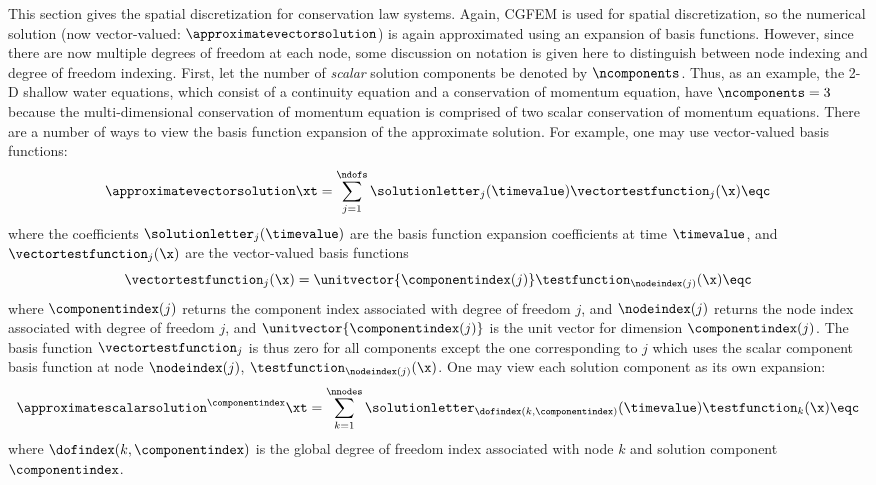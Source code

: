 This section gives the spatial discretization for conservation law systems.
Again, CGFEM is used for
spatial discretization, so the numerical solution (now vector-valued:
$\approximatevectorsolution$) is again approximated using an expansion of basis
functions. However, since there are now multiple degrees of freedom at each
node, some discussion on notation is given here to distinguish between node
indexing and degree of freedom indexing.  First, let the number of
\emph{scalar} solution components be denoted by $\ncomponents$.  Thus, as an
example, the 2-D shallow water equations, which consist of a continuity
equation and a conservation of momentum equation, have $\ncomponents=3$ because
the multi-dimensional conservation of momentum equation is comprised of two
scalar conservation of momentum equations.  There are a number of ways to view
the basis function expansion of the approximate solution.
For example, one may use vector-valued basis functions:
\begin{equation}
  \approximatevectorsolution\xt = \sum\limits_{j=1}^{\ndofs}
    \solutionletter_j(\timevalue)\vectortestfunction_j(\x) \eqc
\end{equation}
where the coefficients $\solutionletter_j(\timevalue)$ are the basis function
expansion coefficients at time $\timevalue$, and $\vectortestfunction_j(\x)$
are the vector-valued basis functions
\begin{equation}
  \vectortestfunction_j(\x) = 
    \unitvector{\componentindex(j)}
      \testfunction_{\nodeindex(j)}(\x)
  \eqc
\end{equation}
where $\componentindex(j)$ returns the component index associated with degree
of freedom $j$, and $\nodeindex(j)$ returns the node index associated with
degree of freedom $j$, and $\unitvector{\componentindex(j)}$ is the unit vector
for dimension $\componentindex(j)$. The basis function $\vectortestfunction_j$
is thus zero for all components except the one corresponding to $j$ which uses
the scalar component basis function at node $\nodeindex(j)$,
$\testfunction_{\nodeindex(j)}(\x)$.  One may view each solution component as
its own expansion:
\begin{equation}
  \approximatescalarsolution^\componentindex\xt = \sum\limits_{k=1}^{\nnodes}
    \solutionletter_{\dofindex(k,\componentindex)}(\timevalue)\testfunction_k(\x)
  \eqc
\end{equation}
where $\dofindex(k,\componentindex)$ is the global degree of freedom index
associated with node $k$ and solution component $\componentindex$.

